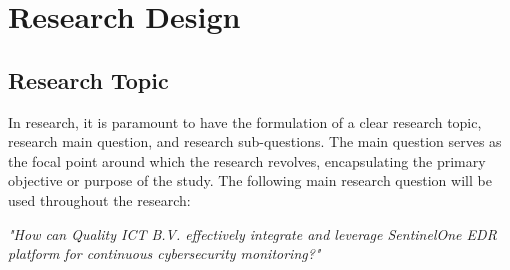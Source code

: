 \chapter{Research Design}
\begin{multicols}{2}
      \section{Research Topic}
      In research, it is paramount to have the formulation of a clear research topic, research main question,
      and research sub-questions. The main question serves as the focal point around which the research revolves,
      encapsulating the primary objective or purpose of the study.
      The following main research question will be used throughout the research:
      \begin{center}
            \textit{"How can Quality ICT B.V. effectively integrate and leverage SentinelOne EDR platform
                  for continuous cybersecurity monitoring?"}
      \end{center}

\end{multicols}
